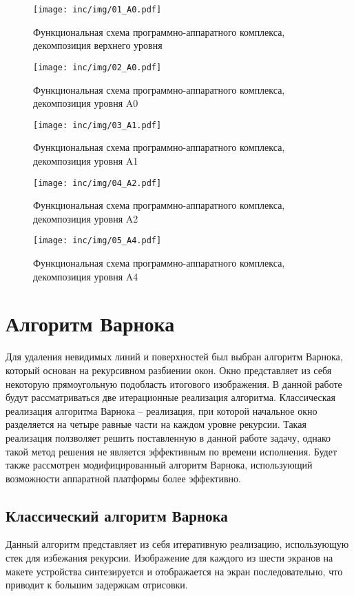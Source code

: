 \begin{figure}[H]
	\centering
	\texttt{[image: inc/img/01\_A0.pdf]}
	\caption{Функциональная схема программно-аппаратного комплекса, декомпозиция верхнего уровня}
	\label{fig:a01}
\end{figure}

\begin{figure}[H]
	\centering
	\texttt{[image: inc/img/02\_A0.pdf]}
	\caption{Функциональная схема программно-аппаратного комплекса, декомпозиция уровня A0}
	\label{fig:a02}
\end{figure}

\begin{figure}[H]
	\centering
	\texttt{[image: inc/img/03\_A1.pdf]}
	\caption{Функциональная схема программно-аппаратного комплекса, декомпозиция уровня A1}
	\label{fig:a1}
\end{figure}

\begin{figure}[H]
	\centering
	\texttt{[image: inc/img/04\_A2.pdf]}
	\caption{Функциональная схема программно-аппаратного комплекса, декомпозиция уровня A2}
	\label{fig:a2}
\end{figure}

\begin{figure}[H]
	\centering
	\texttt{[image: inc/img/05\_A4.pdf]}
	\caption{Функциональная схема программно-аппаратного комплекса, декомпозиция уровня A4}
	\label{fig:a4}
\end{figure}

\section{Алгоритм Варнока}
Для удаления невидимых линий и поверхностей был выбран алгоритм Варнока, который основан на рекурсивном разбиении окон. 
Окно представляет из себя некоторую прямоугольную подобласть итогового изображения.
В данной работе будут рассматриваться две итерационные реализация алгоритма. Классическая реализация алгоритма Варнока -- реализация, при которой начальное окно разделяется на четыре равные части на каждом уровне рекурсии. Такая реализация ползволяет решить поставленную в данной работе задачу, однако такой метод решения не является эффективным по времени исполнения. Будет также рассмотрен модифицированный алгоритм Варнока, использующий возможности аппаратной платформы более эффективно. 

\subsection{Классический алгоритм Варнока}
Данный алгоритм представляет из себя итеративную реализацию, использующую стек для избежания рекурсии. Изображение для каждого из шести экранов на макете устройства синтезируется и отображается на экран последовательно, что приводит к большим задержкам отрисовки. 

